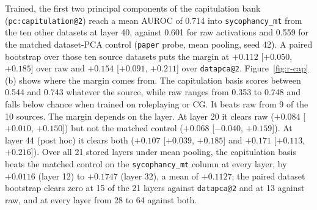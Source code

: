 Trained, the first two principal components of the capitulation bank (\texttt{pc:capitulation@2}) reach a mean AUROC of 0.714 into \texttt{sycophancy\_mt} from the ten other datasets at layer 40, against 0.601 for raw activations and 0.559 for the matched dataset-PCA control (\texttt{paper} probe, mean pooling, seed 42). %
A paired bootstrap over those ten source datasets puts the margin at $+0.112$ [$+0.050$, $+0.185$] over raw and $+0.154$ [$+0.091$, $+0.211$] over \texttt{datapca@2}. %
Figure~\ref{fig:r-cap}(b) shows where the margin comes from. %
The capitulation basis scores between 0.544 and 0.743 whatever the source, while raw ranges from 0.353 to 0.748 and falls below chance when trained on roleplaying or CG. %
It beats raw from 9 of the 10 sources. %
The margin depends on the layer. %
At layer 20 it clears raw ($+0.084$ [$+0.010$, $+0.150$]) but not the matched control ($+0.068$ [$-0.040$, $+0.159$]). %
At layer 44 (post hoc) it clears both ($+0.107$ [$+0.039$, $+0.185$] and $+0.171$ [$+0.113$, $+0.216$]). %
Over all 21 stored layers under mean pooling, the capitulation basis beats the matched control on the \texttt{sycophancy\_mt} column at every layer, by $+0.0116$ (layer 12) to $+0.1747$ (layer 32), a mean of $+0.1127$; the paired dataset bootstrap clears zero at 15 of the 21 layers against \texttt{datapca@2} and at 13 against raw, and at every layer from 28 to 64 against both. %
